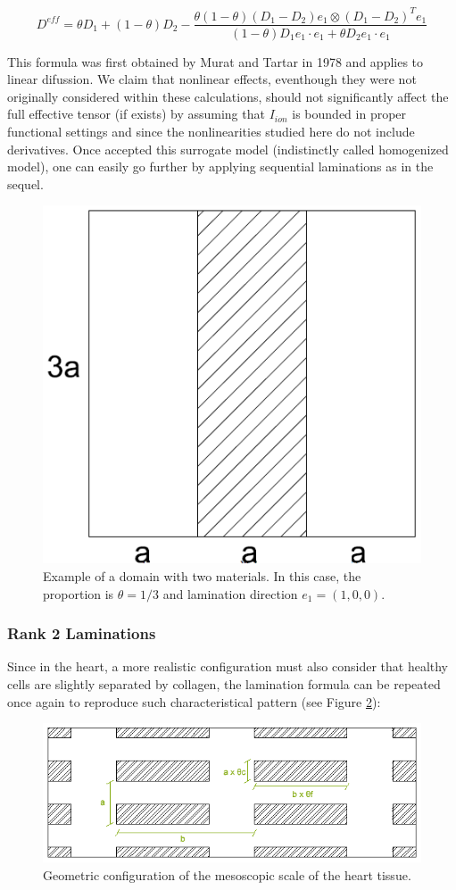\begin{equation}
D^{eff} = \theta D_1 + (1 - \theta) D_2 - \frac{\theta (1 - \theta)(D_1 - D_2)e_1 \otimes (D_1 - D_2)^T e_1}{(1 - \theta)D_1 e_1 \cdot e_1 + \theta D_2 e_1 \cdot e_1 } \label{eq:homogenization_rank1}
\end{equation}

This formula was first obtained by Murat and Tartar in 1978 and applies to linear difussion. We claim that nonlinear effects, eventhough they were not originally considered within these calculations, should not significantly affect the full effective tensor (if exists) by assuming that $I_{ion}$ is bounded in proper functional settings and since the nonlinearities studied here do not include derivatives. Once accepted this surrogate model (indistinctly called homogenized model), one can easily go further by applying sequential laminations as in the sequel.

\begin{figure}[!htbp]
\centering
\includegraphics[height = 5 cm]{fig/theorem_verification_r1-ejemplo_laminaciones} 
\caption{Example of a domain with two materials. In this case, the proportion is $\theta = 1/3$ and lamination direction $e_1 = (1,0,0)$.} \label{fig:lamination_fig}
\end{figure}

\subsubsection*{Rank 2 Laminations}

Since in the heart, a more realistic configuration must also consider that healthy cells are slightly separated by collagen, the lamination formula can be repeated once again to reproduce such characteristical pattern (see Figure \ref{fig:geometry_convention}):

\begin{figure}[!htbp]
\centering
\includegraphics[height = 5 cm]{fig/theorem_verification_r2-geometry_convention} 
\caption{Geometric configuration of the mesoscopic scale of the heart tissue.} \label{fig:geometry_convention}
\end{figure}

